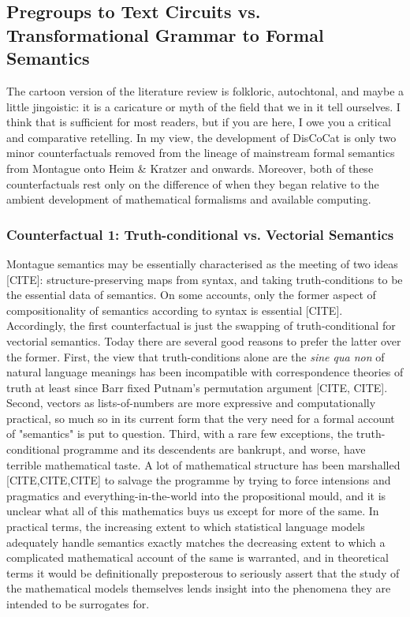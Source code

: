 \subsection{Pregroups to Text Circuits vs. Transformational Grammar to Formal Semantics}

The cartoon version of the literature review is folkloric, autochtonal, and maybe a little jingoistic: it is a caricature or myth of the field that we in it tell ourselves. I think that is sufficient for most readers, but if you are here, I owe you a critical and comparative retelling. In my view, the development of DisCoCat is only two minor counterfactuals removed from the lineage of mainstream formal semantics from Montague onto Heim \& Kratzer and onwards. Moreover, both of these counterfactuals rest only on the difference of when they began relative to the ambient development of mathematical formalisms and available computing.\\

\subsubsection{Counterfactual 1: Truth-conditional vs. Vectorial Semantics}

Montague semantics may be essentially characterised as the meeting of two ideas [CITE]: structure-preserving maps from syntax, and taking truth-conditions to be the essential data of semantics. On some accounts, only the former aspect of compositionality of semantics according to syntax is essential [CITE]. Accordingly, the first counterfactual is just the swapping of truth-conditional for vectorial semantics. Today there are several good reasons to prefer the latter over the former. First, the view that truth-conditions alone are the \emph{sine qua non} of natural language meanings has been incompatible with correspondence theories of truth at least since Barr fixed Putnam's permutation argument [CITE, CITE]. Second, vectors as lists-of-numbers are more expressive and computationally practical, so much so in its current form that the very need for a formal account of "semantics" is put to question. Third, with a rare few exceptions, the truth-conditional programme and its descendents are bankrupt, and worse, have terrible mathematical taste. A lot of mathematical structure has been marshalled [CITE,CITE,CITE] to salvage the programme by trying to force intensions and pragmatics and everything-in-the-world into the propositional mould, and it is unclear what all of this mathematics buys us except for more of the same. In practical terms, the increasing extent to which statistical language models adequately handle semantics exactly matches the decreasing extent to which a complicated mathematical account of the same is warranted, and in theoretical terms it would be definitionally preposterous to seriously assert that the study of the mathematical models themselves lends insight into the phenomena they are intended to be surrogates for.

